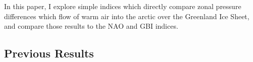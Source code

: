 \documentclass[11pt]{report}
\begin{document}
In this paper, I explore simple indices which directly compare zonal pressure differences which flow of warm air into the arctic over the Greenland Ice Sheet, and compare those results to the NAO and GBI indices.



 
 











\subsection{Previous Results \label{sec:prevresults}}
\end{document}
